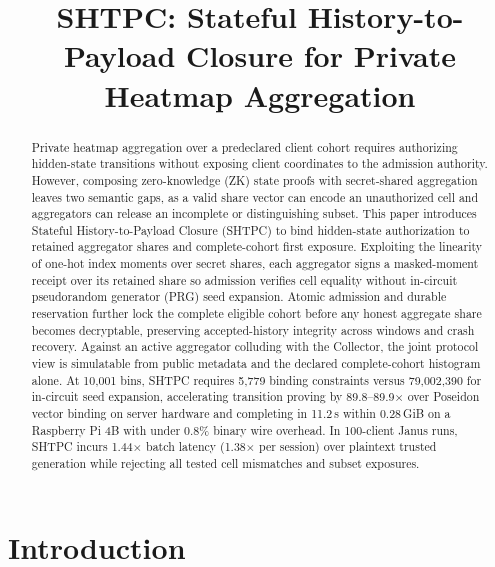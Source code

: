\documentclass[conference,compsoc]{IEEEtran}
\theoremstyle{definition}
\numberwithin{equation}{section}
\numberwithin{table}{section}
\numberwithin{figure}{section}
\theoremstyle{plain}
\begin{document}
\title{SHTPC: Stateful History-to-Payload Closure for Private Heatmap Aggregation}
\author{}
\maketitle
\begin{abstract}
Private heatmap aggregation over a predeclared client cohort requires authorizing hidden-state transitions without exposing client coordinates to the admission authority. However, composing zero-knowledge (ZK) state proofs with secret-shared aggregation leaves two semantic gaps, as a valid share vector can encode an unauthorized cell and aggregators can release an incomplete or distinguishing subset. This paper introduces Stateful History-to-Payload Closure (SHTPC) to bind hidden-state authorization to retained aggregator shares and complete-cohort first exposure. Exploiting the linearity of one-hot index moments over secret shares, each aggregator signs a masked-moment receipt over its retained share so admission verifies cell equality without in-circuit pseudorandom generator (PRG) seed expansion. Atomic admission and durable reservation further lock the complete eligible cohort before any honest aggregate share becomes decryptable, preserving accepted-history integrity across windows and crash recovery. Against an active aggregator colluding with the Collector, the joint protocol view is simulatable from public metadata and the declared complete-cohort histogram alone. At 10,001 bins, SHTPC requires 5,779 binding constraints versus 79,002,390 for in-circuit seed expansion, accelerating transition proving by 89.8--89.9$\times$ over Poseidon vector binding on server hardware and completing in 11.2\,s within 0.28\,GiB on a Raspberry Pi 4B with under 0.8\% binary wire overhead. In 100-client Janus runs, SHTPC incurs 1.44$\times$ batch latency (1.38$\times$ per session) over plaintext trusted generation while rejecting all tested cell mismatches and subset exposures.
\end{abstract}
\section{Introduction}
\label{sec:intro}
\end{document}
